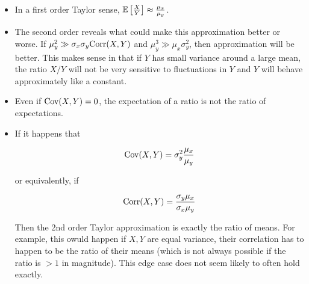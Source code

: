 \documentclass{article}
\begin{document}
\begin{itemize}


    \item In a first order Taylor sense, $\mathbb{E}\left[\frac{X}{Y}\right] \approx \frac{\mu_x}{\mu_y}$. 
    \item The second order reveals what could make this approximation better or worse. If $\mu_y^2 \gg \sigma_x\sigma_y\mbox{Corr}(X,Y)$  and $\mu_y^3 \gg \mu_x\sigma_y^2$, then approximation will be better. This makes sense in that if $Y$ has small variance around a large mean, the ratio $X/Y$ will not be very sensitive to fluctuations in $Y$ and $Y$ will behave approximately like a constant.
    
    \item Even if $\mbox{Cov}(X,Y)=0$, the expectation of a ratio is not the ratio of expectations.
    
    \item If it happens that

    \[ \mbox{Cov}(X,Y)=\sigma_y^2\frac{\mu_x}{\mu_y}\]

    or equivalently, if
    
\[ \mbox{Corr}(X,Y)=\frac{\sigma_y\mu_x}{\sigma_x\mu_y}\]
    

    Then the 2nd order Taylor approximation is exactly the ratio of means. 
    For example, this owuld happen if $X,Y$ are equal variance, their correlation has to happen to be the ratio of their means (which is not always possible if the ratio is $>1$ in magnitude). This edge case does not seem likely to often hold exactly.
    
    
\end{itemize}
\end{document}
